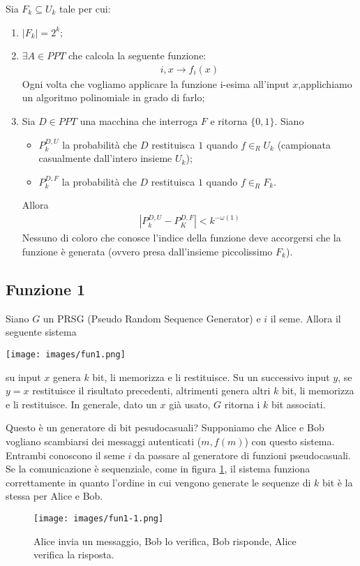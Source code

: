 \begin{definition}
    Sia $F_k \subseteq U_k$ tale per cui:
    \begin{enumerate}
        \item $|F_k| = 2^k$;
        \item $\exists A \in PPT$ che calcola la seguente funzione:
        \begin{align*}
            i, x \rightarrow f_i(x)
        \end{align*}
        Ogni volta che vogliamo applicare la funzione i-esima all'input $x$,applichiamo un algoritmo polinomiale in grado di farlo;
        \item Sia $D \in PPT$ una macchina che interroga $F$ e ritorna $\{0, 1\}$. Siano
        \begin{itemize}
            \item $P_k^{D, U}$ la probabilità che $D$ restituisca $1$ quando $f \in_R U_k$ (campionata casualmente dall'intero insieme $U_k$);
            \item $P_k^{D, F}$ la probabilità che $D$ restituisca $1$ quando $f \in_R F_k$.
        \end{itemize}
        Allora
        \begin{align*}
            \left| P_k^{D, U} - P_K^{D, F} \right| < k^{-\omega(1)}
        \end{align*}
        Nessuno di coloro che conosce l'indice della funzione deve accorgersi che la funzione è generata (ovvero presa dall'insieme piccolissimo $F_k$).
    \end{enumerate}
\end{definition}

\subsection{Funzione 1}
Siano $G$ un PRSG (Pseudo Random Sequence Generator) e $i$ il seme. Allora il seguente sistema
\begin{center}
    \texttt{[image: images/fun1.png]}
\end{center}
\noindent su input $x$ genera $k$ bit, li memorizza e li restituisce. Su un successivo input $y$, se $y = x$ restituisce il risultato precedenti, altrimenti genera altri $k$ bit, li memorizza e li restituisce. In generale, dato un $x$ già usato, $G$ ritorna i $k$ bit associati.

Questo è un generatore di bit pesudocasuali? Supponiamo che Alice e Bob vogliano scambiarsi dei messaggi autenticati ($m, f(m)$) con questo sistema. Entrambi conoscono il seme $i$ da passare al generatore di funzioni pseudocasuali. Se la comunicazione è sequenziale, come in figura \ref{fig:fun1-1}, il sistema funziona correttamente in quanto l'ordine in cui vengono generate le sequenze di $k$ bit è la stessa per Alice e Bob. 
\begin{figure}
    \centering
    \texttt{[image: images/fun1-1.png]}
    \caption{Alice invia un messaggio, Bob lo verifica, Bob risponde, Alice verifica la risposta.}
    \label{fig:fun1-1}
\end{figure}

